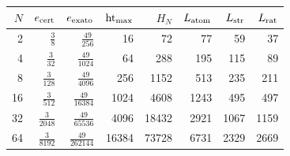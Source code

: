 \begin{tabular}{rrrrrrrr}
\toprule
$N$ & $e_{\rm cert}$ & $e_{\rm exato}$ & $\operatorname{ht}_{\max}$ & $H_N$ & $L_{\rm atom}$ & $L_{\rm str}$ & $L_{\rm rat}$\\
\midrule
2 & $\frac{3}{8}$ & $\frac{49}{256}$ & 16 & 72 & 77 & 59 & 37\\
4 & $\frac{3}{32}$ & $\frac{49}{1024}$ & 64 & 288 & 195 & 115 & 89\\
8 & $\frac{3}{128}$ & $\frac{49}{4096}$ & 256 & 1152 & 513 & 235 & 211\\
16 & $\frac{3}{512}$ & $\frac{49}{16384}$ & 1024 & 4608 & 1243 & 495 & 497\\
32 & $\frac{3}{2048}$ & $\frac{49}{65536}$ & 4096 & 18432 & 2921 & 1067 & 1159\\
64 & $\frac{3}{8192}$ & $\frac{49}{262144}$ & 16384 & 73728 & 6731 & 2329 & 2669\\
\bottomrule
\end{tabular}
